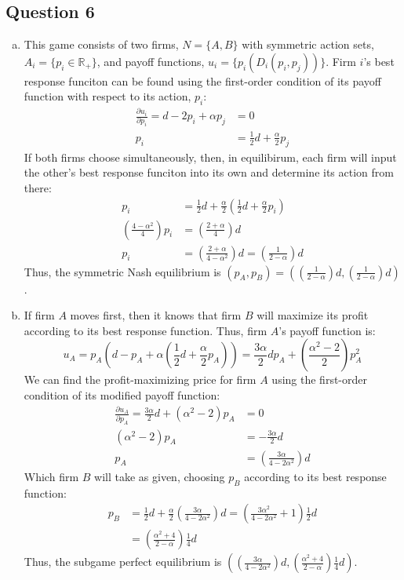 \documentclass{article}
\newcommand{\R}{\mathbb{R}}
\begin{document}

\subsection*{Question 6}

\begin{enumerate}[(a)]
	\item This game consists of two firms, ${N=\{A,B\}}$ with symmetric action sets, ${A_i=\{p_i\in\R_+\}}$, and payoff functions, ${u_i=\{p_i(D_i(p_i,p_j))\}}$. Firm $i$'s best response funciton can be found using the first-order condition of its payoff function with respect to its action, $p_i$:
		\begin{align*}
			\frac{\partial u_i}{\partial p_i} = d - 2p_i + \alpha p_j &= 0	\\
												p_i &= \frac{1}{2}d + \frac{\alpha}{2}p_j
		\end{align*}
		If both firms choose simultaneously, then, in equilibirum, each firm will input the other's best response funciton into its own and determine its action from there:
		\begin{align*}
			p_i &= \frac{1}{2}d + \frac{\alpha}{2}\left(\frac{1}{2}d + \frac{\alpha}{2}p_i\right)	\\
			\left(\frac{4-\alpha^2}{4}\right) p_i &= \left(\frac{2+\alpha}{4}\right)d 	\\
			p_i &= \left(\frac{2+\alpha}{4-\alpha^2}\right)d = \left(\frac{1}{2-\alpha}\right)d
		\end{align*}
		Thus, the symmetric Nash equilibrium is ${(p_A,p_B) = \left(\left(\frac{1}{2-\alpha}\right)d,\left(\frac{1}{2-\alpha}\right)d\right)}$.
	
	\item If firm $A$ moves first, then it knows that firm $B$ will maximize its profit according to its best response function. Thus, firm $A$'s payoff function is:
		\[
			u_A=p_A\left(d - p_A + \alpha\left(\frac{1}{2}d + \frac{\alpha}{2}p_A\right)\right) = \frac{3\alpha}{2}dp_A + \left(\frac{\alpha^2-2}{2}\right)p_A^2
		\]
		We can find the profit-maximizing price for firm $A$ using the first-order condition of its modified payoff function:
		\begin{align*}
			\frac{\partial u_A}{\partial p_A} = \frac{3\alpha}{2}d + \left(\alpha^2-2\right)p_A  &= 0	\\
			\left(\alpha^2-2\right)p_A  &= -\frac{3\alpha}{2}d	\\
			p_A &= \left(\frac{3\alpha}{4-2\alpha^2}\right)d
		\end{align*}
		Which firm $B$ will take as given, choosing $p_B$ according to its best response function:
		\begin{align*}
			p_B &= \frac{1}{2}d + \frac{\alpha}{2}\left(\frac{3\alpha}{4-2\alpha^2}\right)d	= \left(\frac{3\alpha^2}{4-2\alpha^2}+1\right)\frac{1}{2}d \\
				&= \left(\frac{\alpha^2 + 4}{2-\alpha}\right)\frac{1}{4}d 
		\end{align*}
		Thus, the subgame perfect equilibrium is ${\left(\left(\frac{3\alpha}{4-2\alpha^2}\right)d,\left(\frac{\alpha^2 + 4}{2-\alpha}\right)\frac{1}{4}d \right)}$.
		

\end{enumerate}
\end{document}
